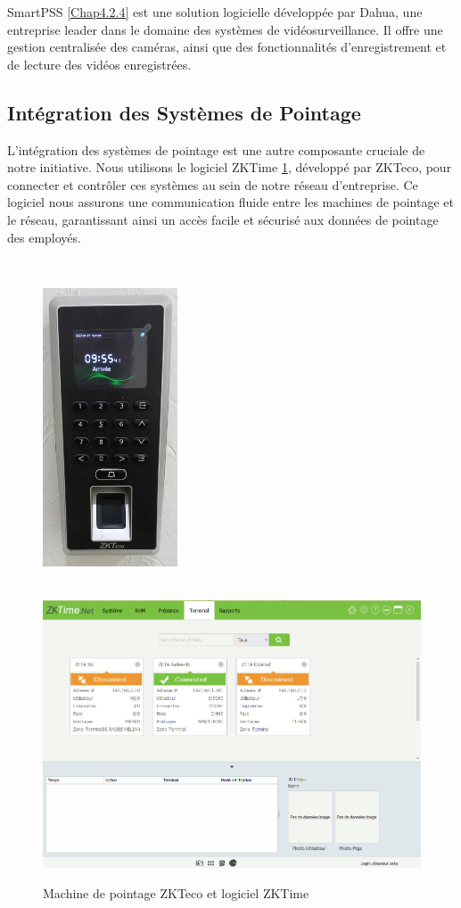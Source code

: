 SmartPSS \ref{Chap4.2.4} est une solution logicielle développée par Dahua, une entreprise leader dans le domaine des systèmes de vidéosurveillance. Il offre une gestion centralisée des caméras, ainsi que des fonctionnalités d'enregistrement et de lecture des vidéos enregistrées. 


\subsection{Intégration des Systèmes de Pointage}

L'intégration des systèmes de pointage est une autre composante cruciale de notre initiative. Nous utilisons le logiciel ZKTime \ref{Chap4.2.5}, développé par ZKTeco, pour connecter et contrôler ces systèmes au sein de notre réseau d'entreprise. Ce logiciel nous assurons une communication fluide entre les machines de pointage et le réseau, garantissant ainsi un accès facile et sécurisé aux données de pointage des employés.

\begin{figure}[H]
\centering
\includegraphics[height=10cm,width=4cm]{Images/BRades-Pointage.jpg}\includegraphics[width=12cm]{Images/ZKTime.png}
\caption{Machine de pointage ZKTeco et logiciel ZKTime}
\label{Chap4.2.5}
\end{figure}
\smallskip

